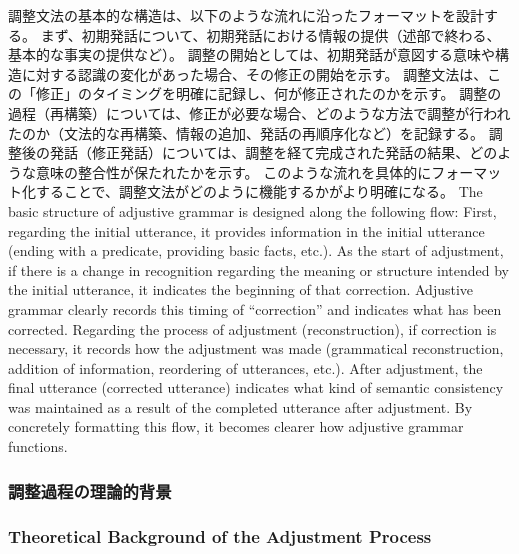 \documentclass[a4paper,xelatex,ja=standard]{bxjsarticle}
\begin{document}
\ifJPN
調整文法の基本的な構造は、以下のような流れに沿ったフォーマットを設計する。
まず、初期発話について、初期発話における情報の提供（述部で終わる、基本的な事実の提供など）。
調整の開始としては、初期発話が意図する意味や構造に対する認識の変化があった場合、その修正の開始を示す。
調整文法は、この「修正」のタイミングを明確に記録し、何が修正されたのかを示す。
調整の過程（再構築）については、修正が必要な場合、どのような方法で調整が行われたのか（文法的な再構築、情報の追加、発話の再順序化など）を記録する。
調整後の発話（修正発話）については、調整を経て完成された発話の結果、どのような意味の整合性が保たれたかを示す。
このような流れを具体的にフォーマット化することで、調整文法がどのように機能するかがより明確になる。
\else
The basic structure of adjustive grammar is designed along the following flow:
First, regarding the initial utterance, it provides information in the initial utterance (ending with a predicate, providing basic facts, etc.).
As the start of adjustment, if there is a change in recognition regarding the meaning or structure intended by the initial utterance, it indicates the beginning of that correction.
Adjustive grammar clearly records this timing of ``correction'' and indicates what has been corrected.
Regarding the process of adjustment (reconstruction), if correction is necessary, it records how the adjustment was made (grammatical reconstruction, addition of information, reordering of utterances, etc.).
After adjustment, the final utterance (corrected utterance) indicates what kind of semantic consistency was maintained as a result of the completed utterance after adjustment.
By concretely formatting this flow, it becomes clearer how adjustive grammar functions.
\fi

\ifJPN
\subsubsection{調整過程の理論的背景}
\else
\subsubsection{Theoretical Background of the Adjustment Process}
\fi
\end{document}
